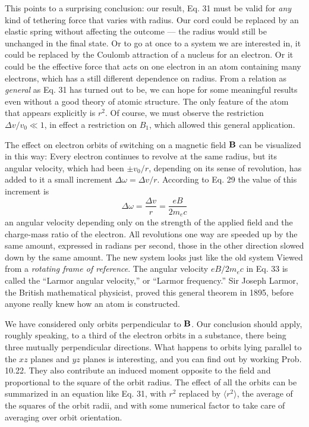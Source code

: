 This points to a surprising conclusion: our result, Eq. 31 must be
valid for \emph{any} kind of tethering force that varies with radius. Our
cord could be replaced by an elastic spring without affecting the
outcome --- the radius would still be unchanged in the final state.
Or to go at once to a system we are interested in, it could be replaced
by the Coulomb attraction of a nucleus for an electron. Or it could
be the effective force that acts on one electron in an atom containing
many electrons, which has a still diflerent dependence on radius.
From a relation as \emph{general} as Eq. 31 has turned out to be, we can hope
for some meaningful results even without a good theory of atomic
structure. The only feature of the atom that appears explicitly is $r^2$.
Of course, we must observe the restriction $\Delta v/v_0 \ll 1$, in effect a
restriction on $B_1$, which allowed this general application.

The effect on electron orbits of switching on a magnetic field $\mathbf{B}$ can
be visualized in this way: Every electron continues to revolve at the
same radius, but its angular velocity, which had been $\pm v_0/r$, depending
on its sense of revolution, has added to it a small increment
$\Delta\omega=\Delta v/r$. According to Eq. 29 the value of this increment is
\begin{equation}
  \Delta\omega = \frac{\Delta v}{r} = \frac{eB}{2m_ec}
\end{equation}
an angular velocity depending only on the strength of the applied
field and the charge-mass ratio of the electron. All revolutions one
way are speeded up by the same amount, expressed in radians per
second, those in the other direction slowed down by the same
amount. The new system looks just like the old system Viewed from
a \emph{rotating frame of reference}. The angular velocity $eB/2m_ec$ in Eq. 33
is called the ``Larmor angular velocity,'' or ``Larmor frequency.''
Sir Joseph Larmor, the British mathematical physicist, proved this
general theorem in 1895, before anyone really knew how an atom
is constructed.

We have considered only orbits perpendicular to $\mathbf{B}$. Our conclusion
should apply, roughly speaking, to a third of the electron
orbits in a substance, there being three mutually perpendicular
directions. What happens to orbits lying parallel to the $xz$ planes
and $yz$ planes is interesting, and you can find out by working
Prob. 10.22. They also contribute an induced moment opposite to
the field and proportional to the square of the orbit radius. The
effect of all the orbits can be summarized in an equation like Eq. 31,
with $r^2$ replaced by $\langle r^2 \rangle$, the average of the squares of the orbit radii,
and with some numerical factor to take care of averaging over orbit
orientation.

